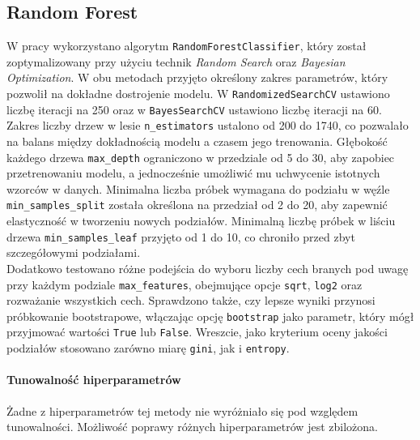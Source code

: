\documentclass[a4paper,11pt]{article}
\begin{document}
\subsection{Random Forest}
W pracy wykorzystano algorytm \texttt{RandomForestClassifier}, który został zoptymalizowany przy użyciu technik \emph{Random Search} oraz \emph{Bayesian Optimization}. W obu metodach przyjęto określony zakres parametrów, który pozwolił na dokładne dostrojenie modelu. W \texttt{RandomizedSearchCV} ustawiono liczbę iteracji na 250 oraz w \texttt{BayesSearchCV} ustawiono liczbę iteracji na 60.\\

Zakres liczby drzew w lesie \texttt{n\_estimators} ustalono od 200 do 1740, co pozwalało na balans między dokładnością modelu a czasem jego trenowania. Głębokość każdego drzewa \texttt{max\_depth} ograniczono w przedziale od 5 do 30, aby zapobiec przetrenowaniu modelu, a jednocześnie umożliwić mu uchwycenie istotnych wzorców w danych. Minimalna liczba próbek wymagana do podziału w węźle \texttt{min\_samples\_split} została określona na przedział od 2 do 20, aby zapewnić elastyczność w tworzeniu nowych podziałów. Minimalną liczbę próbek w liściu drzewa \texttt{min\_samples\_leaf} przyjęto od 1 do 10, co chroniło przed zbyt szczegółowymi podziałami.\\

Dodatkowo testowano różne podejścia do wyboru liczby cech branych pod uwagę przy każdym podziale \texttt{max\_features}, obejmujące opcje \texttt{sqrt}, \texttt{log2} oraz rozważanie wszystkich cech. Sprawdzono także, czy lepsze wyniki przynosi próbkowanie bootstrapowe, włączając opcję \texttt{bootstrap} jako parametr, który mógł przyjmować wartości \texttt{True} lub \texttt{False}. Wreszcie, jako kryterium oceny jakości podziałów stosowano zarówno miarę \texttt{gini}, jak i \texttt{entropy}.\\

\paragraph{Tunowalność hiperparametrów \vspace{2ex} \\}
Żadne z hiperparametrów tej metody nie wyróżniało się pod względem tunowalności. Możliwość poprawy różnych hiperparametrów jest zbilożona.
\end{document}
